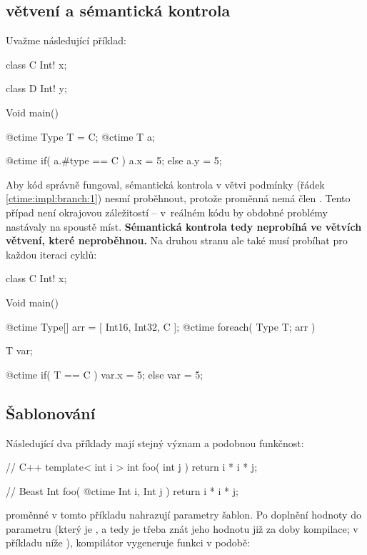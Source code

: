 \subsection{\ctime větvení a sémantická kontrola}

Uvažme následující příklad:
\begin{code}
class C {
	Int! x;
}

class D {
	Int! y;
}
	
Void main() {
	@ctime Type T = C;
	@ctime T a;
	
	@ctime if( a.#type == C )
		a.x = 5;
	else
		a.y = 5; $\label{ctime:impl:branch:1}$
}
\end{code}

Aby kód správně fungoval, sémantická kontrola v  větvi podmínky (řádek \ref{ctime:impl:branch:1}) nesmí proběhnout, protože proměnná  nemá člen . Tento případ není okrajovou záležitostí -- v~reálném \ctime kódu by obdobné problémy nastávaly na spoustě míst. \textbf{Sémantická kontrola tedy neprobíhá ve větvích \ctime větvení, které neproběhnou.} Na druhou stranu ale také musí probíhat pro každou iteraci \ctime cyklů:

\begin{code}
class C { 
	Int! x;
}
	
Void main() {
	@ctime Type[] arr = [ Int16, Int32, C ];
	@ctime foreach( Type T; arr ) {
		T var;
		
		@ctime if( T == C )
			var.x = 5;
		else
			var = 5;
	}
}
\end{code}

\subsection{Šablonování}
Následující dva příklady mají stejný význam a podobnou funkčnost:
\begin{cppcode}
// C++
template< int i >
int foo( int j ) {
	return i * i * j;
}
\end{cppcode}

\begin{code}
// Beast
Int foo( @ctime Int i, Int j ) {
	return i * i * j;
}
\end{code}

\ctime proměnné v tomto příkladu nahrazují parametry šablon. Po doplnění hodnoty do parametru  (který je \ctime, a tedy je třeba znát jeho hodnotu již za doby kompilace; v příkladu níže ), kompilátor vygeneruje funkci v podobě:

